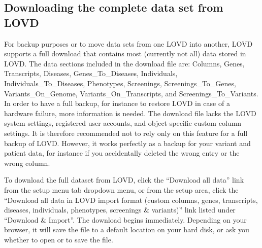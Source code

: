 \documentclass[a4paper,oneside,openany,12pt]{memoir}
\renewenvironment{leftbar}[1][\hsize]
{%
    \def\FrameCommand
    {%
        {\color{LOVDdark}\vrule width 3pt \hspace{5pt}}%
        \colorbox{LOVDlight}%
    }%
    \MakeFramed{\hsize#1\advance\hsize-\width\FrameRestore}%
}
{\endMakeFramed}
\begin{document}
\subsection{Downloading the complete data set from LOVD}
For backup purposes or to move data sets from one LOVD into another, LOVD supports a full download that contains most (currently not all) data stored in LOVD.
The data sections included in the download file are: Columns, Genes, Transcripts, Diseases, Genes\_To\_Diseases, Individuals, Individuals\_To\_Diseases,
 Phenotypes, Screenings, Screenings\_To\_Genes, Variants\_On\_Genome, Variants\_On\_Transcripts, and Screenings\_To\_Variants.
In order to have a full backup, for instance to restore LOVD in case of a hardware failure, more information is needed.
The download file lacks the LOVD system settings, registered user accounts, and object-specific custom column settings.
It is therefore recommended not to rely only on this feature for a full backup of LOVD.
However, it works perfectly as a backup for your variant and patient data, for instance if you accidentally deleted the wrong entry or the wrong column.

To download the full dataset from LOVD, click the ``Download all data'' link from the setup menu tab dropdown menu, or from the setup area,
 click the ``Download all data in LOVD import format (custom columns, genes, transcripts, diseases, individuals, phenotypes, screenings \& variants)'' link listed under ``Download \& Import''.
The download begins immediately.
Depending on your browser, it will save the file to a default location on your hard disk, or ask you whether to open or to save the file.



\hypertarget{ssec:download_owned_data}{}
\end{document}
